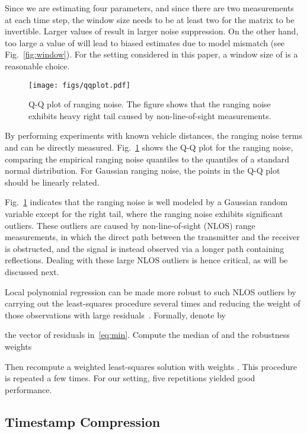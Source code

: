 \documentclass[12pt,journal,final,onecolumn]{IEEEtran}
\theoremstyle{definition}
\theoremstyle{myremark}
\begin{document}
Since we are estimating four parameters, and since there are two measurements at
each time step, the window size  needs to be at least two for the matrix
 to be invertible. Larger values of  result
in larger noise suppression. On the other hand, too large a value of  will
lead to biased estimates due to model mismatch (see Fig.~\ref{fig:window}). For
the setting considered in this paper, a window size of  is a reasonable
choice.

\begin{figure}[htbp]
    \centering 
    \texttt{[image: figs/qqplot.pdf]} 

    \caption{Q-Q plot of ranging noise. The figure shows that the ranging noise
    exhibits heavy right tail caused by non-line-of-sight measurements.}
    \label{fig:qqplot}
\end{figure}

By performing experiments with known vehicle distances, the ranging noise terms
 and  can be directly measured. Fig.~\ref{fig:qqplot} shows the
Q-Q plot for the ranging noise, comparing the empirical ranging noise quantiles
to the quantiles of a standard normal distribution. For Gaussian ranging noise,
the points in the Q-Q plot should be linearly related. 

Fig.~\ref{fig:qqplot} indicates that the ranging noise is well modeled by a
Gaussian random variable except for the right tail, where the ranging noise
exhibits significant outliers. These outliers are caused by non-line-of-sight
(NLOS) range measurements, in which the direct path between the transmitter and
the receiver is obstructed, and the signal is instead observed via a longer path
containing reflections. Dealing with these large NLOS outliers is hence
critical, as will be discussed next.

Local polynomial regression can be made more robust to such NLOS outliers by
carrying out the least-squares procedure several times and reducing the weight
of those observations with large residuals~\cite{cleveland79}. Formally, denote
by 

the vector of residuals in~\eqref{eq:min}. Compute the median  of 
and the robustness weights

Then recompute a weighted least-squares solution with weights .
This procedure is repeated a few times. For our setting, five repetitions 
yielded good performance.


\subsection{Timestamp Compression}
\label{sec:main_compression}
\end{document}
